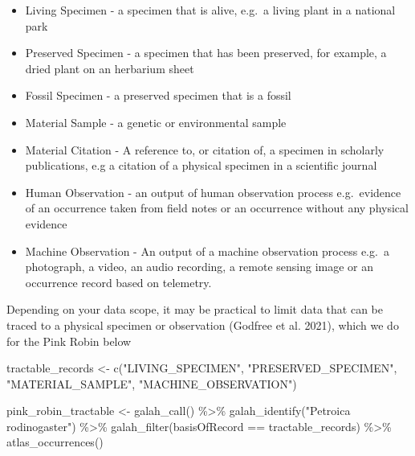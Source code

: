 \documentclass[
  letterpaper,
  DIV=11,
  numbers=noendperiod,
  oneside]{scrreprt}
\newenvironment{Shaded}{\begin{snugshade}}{\end{snugshade}}
\newcommand{\FunctionTok}[1]{\textcolor[rgb]{0.28,0.35,0.67}{#1}}
\newcommand{\NormalTok}[1]{\textcolor[rgb]{0.00,0.23,0.31}{#1}}
\newcommand{\OtherTok}[1]{\textcolor[rgb]{0.00,0.23,0.31}{#1}}
\newcommand{\SpecialCharTok}[1]{\textcolor[rgb]{0.37,0.37,0.37}{#1}}
\newcommand{\StringTok}[1]{\textcolor[rgb]{0.13,0.47,0.30}{#1}}
\providecommand{\tightlist}{%
  \setlength{\itemsep}{0pt}\setlength{\parskip}{0pt}}\usepackage{longtable,booktabs,array}
\begin{document}
\begin{itemize}
\tightlist
\item
  Living Specimen - a specimen that is alive, e.g.~a living plant in a
  national park
\item
  Preserved Specimen - a specimen that has been preserved, for example,
  a dried plant on an herbarium sheet
\item
  Fossil Specimen - a preserved specimen that is a fossil
\item
  Material Sample - a genetic or environmental sample
\item
  Material Citation - A reference to, or citation of, a specimen in
  scholarly publications, e.g a citation of a physical specimen in a
  scientific journal
\item
  Human Observation - an output of human observation process
  e.g.~evidence of an occurrence taken from field notes or an occurrence
  without any physical evidence
\item
  Machine Observation - An output of a machine observation process
  e.g.~a photograph, a video, an audio recording, a remote sensing image
  or an occurrence record based on telemetry.
\end{itemize}

Depending on your data scope, it may be practical to limit data that can
be traced to a physical specimen or observation (Godfree et al. 2021),
which we do for the Pink Robin below

\begin{Shaded}
\begin{Highlighting}[]
\NormalTok{tractable\_records }\OtherTok{\textless{}{-}} \FunctionTok{c}\NormalTok{(}\StringTok{"LIVING\_SPECIMEN"}\NormalTok{, }
                       \StringTok{"PRESERVED\_SPECIMEN"}\NormalTok{, }
                       \StringTok{"MATERIAL\_SAMPLE"}\NormalTok{, }
                       \StringTok{"MACHINE\_OBSERVATION"}\NormalTok{)}

\NormalTok{pink\_robin\_tractable }\OtherTok{\textless{}{-}} \FunctionTok{galah\_call}\NormalTok{() }\SpecialCharTok{\%\textgreater{}\%} 
  \FunctionTok{galah\_identify}\NormalTok{(}\StringTok{"Petroica rodinogaster"}\NormalTok{) }\SpecialCharTok{\%\textgreater{}\%} 
  \FunctionTok{galah\_filter}\NormalTok{(basisOfRecord }\SpecialCharTok{==}\NormalTok{ tractable\_records) }\SpecialCharTok{\%\textgreater{}\%} 
  \FunctionTok{atlas\_occurrences}\NormalTok{()}
\end{Highlighting}
\end{Shaded}
\end{document}
